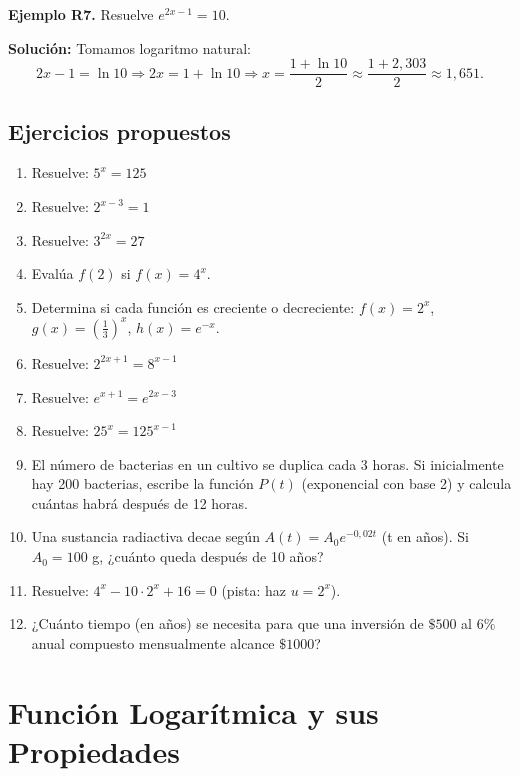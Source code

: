 \documentclass[12pt, a4paper]{article}
\begin{document}
  \textbf{Ejemplo R7.} Resuelve $e^{2x - 1} = 10$.

  \begin{cuadrosolucion}
    \textbf{Solución:} Tomamos logaritmo natural:
    $$2x - 1 = \ln 10 \Rightarrow 2x = 1 + \ln 10 \Rightarrow x = \frac{1 + \ln 10}{2} \approx \frac{1 + 2{,}303}{2} \approx 1{,}651.$$
  \end{cuadrosolucion}

  \subsection{Ejercicios propuestos}

  \begin{enumerate}[leftmargin=*]
    \item \facil{} Resuelve: $5^x = 125$
    \item \facil{} Resuelve: $2^{x-3} = 1$
    \item \facil{} Resuelve: $3^{2x} = 27$
    \item \facil{} Evalúa $f(2)$ si $f(x) = 4^x$.
    \item \facil{} Determina si cada función es creciente o decreciente: $f(x) = 2^x$, $g(x) = \left(\frac{1}{3}\right)^x$, $h(x) = e^{-x}$.
    \item \medio{} Resuelve: $2^{2x+1} = 8^{x-1}$
    \item \medio{} Resuelve: $e^{x+1} = e^{2x-3}$
    \item \medio{} Resuelve: $25^x = 125^{x-1}$
    \item \medio{} El número de bacterias en un cultivo se duplica cada 3 horas. Si inicialmente hay 200 bacterias, escribe la función $P(t)$ (exponencial con base 2) y calcula cuántas habrá después de 12 horas.
    \item \medio{} Una sustancia radiactiva decae según $A(t) = A_0 e^{-0{,}02t}$ (t en años). Si $A_0 = 100$ g, ¿cuánto queda después de 10 años?
    \item \dificil{} Resuelve: $4^x - 10 \cdot 2^x + 16 = 0$ (pista: haz $u = 2^x$).
    \item \dificil{} ¿Cuánto tiempo (en años) se necesita para que una inversión de $\$500$ al $6\%$ anual compuesto mensualmente alcance $\$1000$?
  \end{enumerate}

  \section{Función Logarítmica y sus Propiedades}
\end{document}
